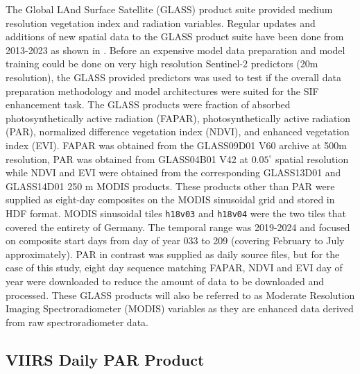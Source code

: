 The Global LAnd Surface Satellite (GLASS) product suite provided medium resolution vegetation index and radiation variables. Regular updates and additions of new spatial data to the GLASS product suite have been done from 2013-2023 as shown in \cite{liang_glass_2013, liang2013global, liang_glass_suite_2020, liang2023updates}. Before an expensive model data preparation and model training could be done on very high resolution Sentinel-2 predictors (20m resolution), the GLASS provided predictors was used to test if the overall data preparation methodology and model architectures were suited for the SIF enhancement task. The GLASS products were fraction of absorbed photosynthetically active radiation (FAPAR), photosynthetically active radiation (PAR), normalized difference vegetation index (NDVI), and enhanced vegetation index (EVI). FAPAR was obtained from the GLASS09D01 V60 archive at 500m resolution, PAR was obtained from GLASS04B01 V42 at $0.05^{\circ}$ spatial resolution while NDVI and EVI were obtained from the corresponding GLASS13D01 and GLASS14D01 250 m MODIS products. These products other than PAR were supplied as eight-day composites on the MODIS sinusoidal grid and stored in HDF format. MODIS sinusoidal tiles \texttt{h18v03} and \texttt{h18v04} were the two tiles that covered the entirety of Germany. The temporal range was 2019-2024 and focused on composite start days from day of year 033 to 209 (covering February to July approximately). PAR in contrast was supplied as daily source files, but for the case of this study, eight day sequence matching FAPAR, NDVI and EVI day of year were downloaded to reduce the amount of data to be downloaded and processed. These GLASS products will also be referred to as Moderate Resolution Imaging Spectroradiometer (MODIS) variables as they are enhanced data derived from raw spectroradiometer data.

\subsection{VIIRS Daily PAR Product}

